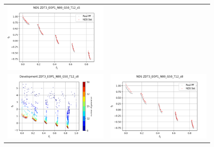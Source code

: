\begin{figure}[H]
\begin{tabular}{c c}
    \includegraphics[scale=0.5]{figures/ZDT3_EOP1_N80_G50_T12/s5_nds.png}\\
    \includegraphics[scale=0.5]{figures/ZDT3_EOP1_N80_G50_T12/s8_dev.png} &
    \includegraphics[scale=0.5]{figures/ZDT3_EOP1_N80_G50_T12/s8_nds.png}\\

\end{tabular}
\end{figure}
